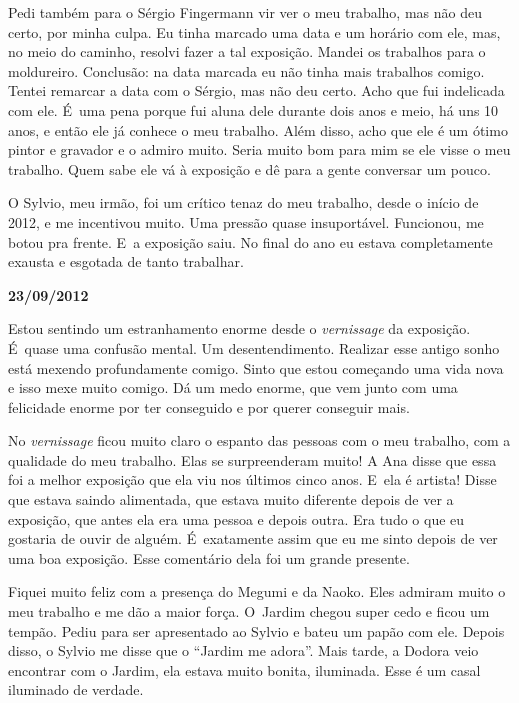 Pedi também para o Sérgio Fingermann vir ver o meu trabalho, mas não deu
certo, por minha culpa. Eu tinha marcado uma data e um horário com ele,
mas, no meio do caminho, resolvi fazer a tal exposição. Mandei os
trabalhos para o moldureiro. Conclusão: na data marcada eu não tinha
mais trabalhos comigo. Tentei remarcar a data com o Sérgio, mas não deu
certo. Acho que fui indelicada com ele. É~uma pena porque fui aluna dele
durante dois anos e meio, há uns 10 anos, e então ele já conhece o meu
trabalho. Além disso, acho que ele é um ótimo pintor e gravador e o
admiro muito. Seria muito bom para mim se ele visse o meu trabalho. Quem
sabe ele vá à exposição e dê para a gente conversar um pouco.

O Sylvio, meu irmão, foi um crítico tenaz do meu trabalho, desde o
início de 2012, e me incentivou muito. Uma pressão quase insuportável.
Funcionou, me botou pra frente. E~a exposição saiu. No final do ano eu
estava completamente exausta e esgotada de tanto trabalhar.

\begin{center}\asterisc{}\end{center}


\begin{flushright}\textbf{23/09/2012}\end{flushright}


Estou sentindo um estranhamento enorme desde o \emph{vernissage} da
exposição. É~quase uma confusão mental. Um desentendimento. Realizar
esse antigo sonho está mexendo profundamente comigo. Sinto que estou
começando uma vida nova e isso mexe muito comigo. Dá um medo enorme, que
vem junto com uma felicidade enorme por ter conseguido e por querer
conseguir mais.

No \emph{vernissage} ficou muito claro o espanto das pessoas com o meu
trabalho, com a qualidade do meu trabalho. Elas se surpreenderam muito!
A Ana disse que essa foi a melhor exposição que ela viu nos últimos
cinco anos. E~ela é artista! Disse que estava saindo alimentada, que
estava muito diferente depois de ver a exposição, que antes ela era uma
pessoa e depois outra. Era tudo o que eu gostaria de ouvir de alguém. É~exatamente assim que eu me sinto depois de ver uma boa exposição. Esse
comentário dela foi um grande presente.

Fiquei muito feliz com a presença do Megumi e da Naoko. Eles admiram
muito o meu trabalho e me dão a maior força. O~Jardim chegou super cedo
e ficou um tempão. Pediu para ser apresentado ao Sylvio e bateu um papão
com ele. Depois disso, o Sylvio me disse que o ``Jardim me adora''. Mais
tarde, a Dodora veio encontrar com o Jardim, ela estava muito bonita,
iluminada. Esse é um casal iluminado de verdade.

